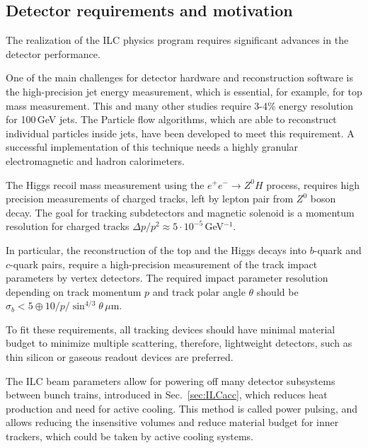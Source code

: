 


\subsection{Detector requirements and motivation}

The realization of the ILC physics program requires significant advances in the detector performance. 

One of the main challenges for detector hardware and reconstruction software is the high-precision jet energy measurement, which is essential, for example, for top mass measurement. This and many other studies require 3-4\%  energy resolution for 100\,GeV jets.
The Particle flow algorithms, which are able to reconstruct individual particles inside jets, have been developed to meet this requirement. 
A successful implementation of this technique needs a highly granular electromagnetic and hadron calorimeters.

The Higgs recoil mass measurement using the $e^+e^- \to Z^0H$ process, requires high precision measurements of charged tracks, left by lepton pair from $Z^0$ boson decay. The goal for tracking subdetectors and magnetic solenoid is a momentum resolution for charged tracks $\Delta p/ p^2 \approx 5 \cdot 10^{-5}$\,GeV$^{-1}$.

In particular, the reconstruction of the top and the Higgs decays into $b$-quark and $c$-quark pairs, require a high-precision measurement of the track impact parameters by vertex detectors. 
The required impact parameter resolution depending on track momentum $p$ and track polar angle $\theta$ should be $\sigma_b < 5  \oplus 10/p/\sin^{4/3}\theta$\,$\mu$m.

To fit these requirements, all tracking devices should have minimal material budget to minimize multiple scattering, therefore, lightweight detectors, such as thin silicon or gaseous readout devices are preferred.

The ILC beam parameters allow for powering off many detector subsystems between bunch trains, introduced in Sec.~\ref{sec:ILCacc}, which reduces heat production and need for active cooling. This method is called power pulsing, and allows reducing the insensitive volumes and reduce material budget for inner trackers, which could be taken by active cooling systems. 

